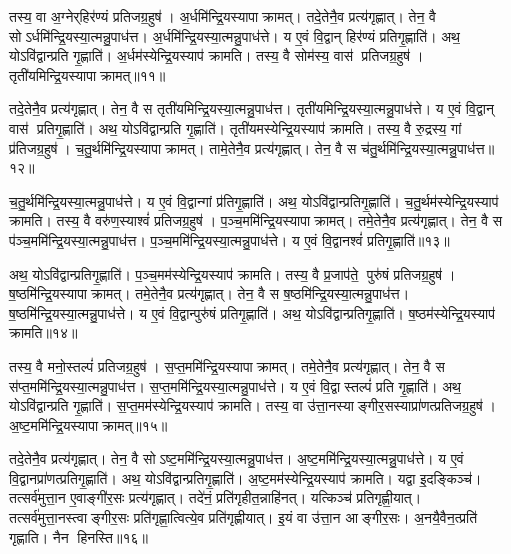 तस्य॒ वा अ॒ग्नेर्‌हिर॑ण्यं प्रतिजग्र॒हुष॑। अ॒र्धमि॑न्द्रि॒यस्यापाक्रामत्। तदे॒तेनै॒व प्रत्य॑गृह्णात्। तेन॒ वै सोऽर्धमि॑न्द्रि॒यस्या॒त्मन्नु॒पाध॑त्त। अ॒र्धमि॑न्द्रि॒यस्या॒त्मन्नु॒पाध॑त्ते। य ए॒वं वि॒द्वान् हिर॑ण्यं प्रतिगृ॒ह्णाति॑। अथ॒ योऽवि॑द्वान्प्रति गृ॒ह्णाति॑। अ॒र्धम॑स्येन्द्रि॒यस्याप॑ क्रामति। तस्य॒ वै सोम॑स्य॒ वास॑ प्रतिजग्र॒हुष॑। तृती॑यमिन्द्रि॒यस्यापाक्रामत्॥११॥

तदे॒तेनै॒व प्रत्य॑गृह्णात्। तेन॒ वै स तृती॑यमिन्द्रि॒यस्या॒त्मन्नु॒पाध॑त्त। तृती॑यमिन्द्रि॒यस्या॒त्मन्नु॒पाध॑त्ते। य ए॒वं वि॒द्वान् वास॑ प्रतिगृ॒ह्णाति॑। अथ॒ योऽवि॑द्वान्प्रति गृ॒ह्णाति॑। तृती॑यमस्येन्द्रि॒यस्याप॑ क्रामति। तस्य॒ वै रु॒द्रस्य॒ गां प्र॑तिजग्र॒हुष॑। च॒तु॒र्थमि॑न्द्रि॒यस्यापाक्रामत्। तामे॒तेनै॒व प्रत्य॑गृह्णात्। तेन॒ वै स च॑तु॒र्थमि॑न्द्रि॒यस्या॒त्मन्नु॒पाध॑त्त॥१२॥

च॒तु॒र्थमि॑न्द्रि॒यस्या॒त्मन्नु॒पाध॑त्ते। य ए॒वं वि॒द्वान्गां प्र॑तिगृ॒ह्णाति॑। अथ॒ योऽवि॑द्वान्प्रतिगृ॒ह्णाति॑। च॒तु॒र्थम॑स्येन्द्रि॒यस्याप॑ क्रामति। तस्य॒ वै वरु॑ण॒स्याश्वं॑ प्रतिजग्र॒हुष॑। प॒ञ्च॒ममि॑न्द्रि॒यस्यापाक्रामत्। तमे॒तेनै॒व प्रत्य॑गृह्णात्। तेन॒ वै स प॑ञ्च॒ममि॑न्द्रि॒यस्या॒त्मन्नु॒पाध॑त्त। प॒ञ्च॒ममि॑न्द्रि॒यस्या॒त्मन्नु॒पाध॑त्ते। य ए॒वं वि॒द्वानश्वं॑ प्रतिगृ॒ह्णाति॑॥१३॥

अथ॒ योऽवि॑द्वान्प्रतिगृ॒ह्णाति॑। प॒ञ्च॒मम॑स्येन्द्रि॒यस्याप॑ क्रामति। तस्य॒ वै प्र॒जाप॑ते॒ पुरु॑षं प्रतिजग्र॒हुष॑। ष॒ष्ठमि॑न्द्रि॒यस्यापाक्रामत्। तमे॒तेनै॒व प्रत्य॑गृह्णात्। तेन॒ वै स ष॒ष्ठमि॑न्द्रि॒यस्या॒त्मन्नु॒पाध॑त्त। ष॒ष्ठमि॑न्द्रि॒यस्या॒त्मन्नु॒पाध॑त्ते। य ए॒वं वि॒द्वान्पुरु॑षं प्रतिगृ॒ह्णाति॑। अथ॒ योऽवि॑द्वान्प्रतिगृ॒ह्णाति॑। ष॒ष्ठम॑स्येन्द्रि॒यस्याप॑ क्रामति॥१४॥

तस्य॒ वै मनो॒स्तल्पं॑ प्रतिजग्र॒हुष॑। स॒प्त॒ममि॑न्द्रि॒यस्यापाक्रामत्। तमे॒तेनै॒व प्रत्य॑गृह्णात्। तेन॒ वै स स॑प्त॒ममि॑न्द्रि॒यस्या॒त्मन्नु॒पाध॑त्त। स॒प्त॒ममि॑न्द्रि॒यस्या॒त्मन्नु॒पाध॑त्ते। य ए॒वं वि॒द्वास्तल्पं॑ प्रति गृ॒ह्णाति॑। अथ॒ योऽवि॑द्वान्प्रति गृ॒ह्णाति॑। स॒प्त॒मम॑स्येन्द्रि॒यस्याप॑ क्रामति। तस्य॒ वा उ॑त्ता॒नस्याङ्गीर॒सस्याप्रा॑णत्प्रतिजग्र॒हुष॑। अ॒ष्ट॒ममि॑न्द्रि॒यस्यापाक्रामत्॥१५॥

तदे॒तेनै॒व प्रत्य॑गृह्णात्। तेन॒ वै सोऽष्ट॒ममि॑न्द्रि॒यस्या॒त्मन्नु॒पाध॑त्त। अ॒ष्ट॒ममि॑न्द्रि॒यस्या॒त्मन्नु॒पाध॑त्ते। य ए॒वं वि॒द्वानप्रा॑णत्प्रतिगृ॒ह्णाति॑। अथ॒ योऽवि॑द्वान्प्रतिगृ॒ह्णाति॑। अ॒ष्ट॒मम॑स्येन्द्रि॒यस्याप॑ क्रामति। यद्वा इ॒दङ्किञ्च॑। तत्सर्व॑मुत्ता॒न ए॒वाङ्गी॑र॒सः प्रत्य॑गृह्णात्। तदे॑नं॒ प्रति॑गृहीत॒न्नाहि॑नत्। यत्किञ्च॑ प्रतिगृह्णी॒यात्। तत्सर्व॑मुत्ता॒नस्त्वाङ्गीर॒सः प्रति॑गृह्णा॒त्वित्ये॒व प्रति॑गृह्णीयात्। इ॒यं वा उ॑त्ता॒न आङ्गीर॒सः। अ॒नयै॒वैन॒त्प्रति॑ गृह्णाति। नैन हिनस्ति॥१६॥\anuvakamend[तृती॑यमिन्द्रि॒यस्यापाक्रामच्चतु॒र्थमि॑न्द्रि॒यस्या॒त्मन्नु॒पाध॒त्ताश्वं॑ प्रतिगृ॒ह्णाति॑ ष॒ष्ठम॑स्येन्द्रि॒यस्याप॑क्रामत्यष्ट॒ममि॑न्द्रि॒यस्यापाक्रामत्प्रतिगृह्णी॒याच्च॒त्वारि॑ च (तस्य॒ वा अ॒ग्नेर्‌हिर॑ण्य॒ सोम॑स्य॒ वास॒स्तदे॒तेन॑ रु॒द्रस्य॒ गान्तामे॒तेन॒ वरु॑ण॒स्याश्वं॑ प्र॒जाप॑ते॒ पुरु॑षं॒ मनो॒स्तल्प॒न्तमे॒तेनोत्ता॒नस्य॒ तदे॒तेनाप्रा॑ण॒द्यद्वै। अ॒र्धं तृती॑यमष्ट॒मं तच्च॑तु॒र्थं तां प॑ञ्च॒म ष॒ष्ठ स॑प्त॒मन्तम्। तदे॒तेन॒ द्वे तामे॒तेनैकं॒ तमे॒तेन॒ त्रीणि॒ तदे॒तेनैकम्॥)]

